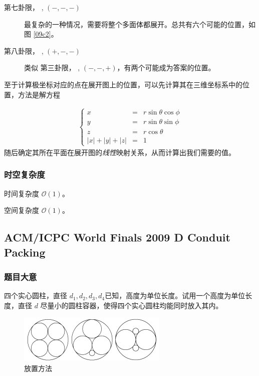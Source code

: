 \begin{description}
					\item[第七卦限， , $(-, -, -)$] 最复杂的一种情况，需要将整个多面体都展开。总共有六个可能的位置，如图  \ref{09c2}。
					\item[第八卦限， , $(+, -, -)$] 类似 第三卦限， , $(-, -, +)$，有两个可能成为答案的位置。
				
				\end{description}
				
				
				至于计算极坐标对应的点在展开图上的位置，可以先计算其在三维坐标系中的位置，方法是解方程

				\begin{align}
					\left\{\begin{array}{rcl}
							x &= &r \sin\theta \cos\phi \\
							y &  =&r \sin\theta \sin\phi \\
							z & =& r \cos\theta\\
							|x| + |y| + |z| & =&  1
						\end{array}
					\right.
				\end{align}
				随后确定其所在平面在展开图的\emph{线性}映射关系，从而计算出我们需要的值。
			\subsubsection{时空复杂度}
				
				时间复杂度 $\mathcal{O}\left(1\right)$。
					
				空间复杂度 $\mathcal{O}\left(1\right)$。
		\newpage
		\subsection{ACM/ICPC World Finals 2009 D Conduit Packing}
			\subsubsection{题目大意}
				四个实心圆柱，直径 $d_{1}, d_2, d_3, d_4$已知，高度为单位长度。试用一个高度为单位长度，直径 $d$ 尽量小的圆柱容器，使得四个实心圆柱均能同时放入其内。
				\begin{figure}[htb]
					\centering
					\includegraphics[width=0.5 \textwidth]{9.png}
					\caption{放置方法}
				\end{figure}
				
